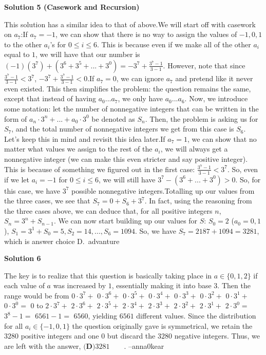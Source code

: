 \begin{enumerate}
 



\textbf{Solution 5 (Casework and Recursion)}

This solution has a similar idea to that of above.We will start off with casework on $a_{7}$:If $a_7 = -1$, we can show that there is no way to assign the values of $-1, 0, 1$ to the other $a_{i}$'s for $0 \leq i \leq 6$. This is because even if we make all of the other $a_{i}$ equal to $1$, we will have that our number is $(-1)(3^{7}) + (3^{6}+3^{5}+...+3^{0}) = -3^{7} + \frac{3^{7}-1}{3-1}$. However, note that since $\frac{3^{7}-1}{3-1} < 3^{7}$, $-3^{7} + \frac{3^{7}-1}{3-1} < 0$.If $a_{7}=0$, we can ignore $a_{7}$ and pretend like it never even existed. This then simplifies the problem: the question remains the same, except that instead of having $a_{0}...a_{7}$, we only have $a_{0}...a_{6}$. Now, we introduce some notation: let the number of nonnegative integers that can be written in the form of $a_{n} \cdot 3^{n} + ... + a_{0} \cdot 3^{0}$ be denoted as $S_{n}$. Then, the problem is asking us for $S_{7}$, and the total number of nonnegative integers we get from this case is $S_{6}$. Let's keep this in mind and revisit this idea later.If $a_{7}=1$, we can show that no matter what values we assign to the rest of the $a_{i}$, we will always get a nonnegative integer (we can make this even stricter and say positive integer). This is because of something we figured out in the first case: $\frac{3^{7}-1}{3-1} < 3^{7}$. So, even if we let $a_{i}=-1$ for $0 \leq i \leq 6$, we will still have $3^{7} - (3^{6}+...+3^{0}) > 0$. So, for this case, we have $3^7$ possible nonnegative integers.Totalling up our values from the three cases, we see that $S_{7} = 0 + S_{6} + 3^{7}$. In fact, using the reasoning from the three cases above, we can deduce that, for all positive integers $n$, $S_{n} = 3^{n} + S_{n-1}$. We can now start building up our values for $S$: $S_{0} = 2$ ($a_{0} = 0, 1$), $S_{1} = 3^{1}+S_{0} = 5, S_{2} = 14, ..., S_{6}=1094$. So, we have $S_{7} = 2187 + 1094 = \boxed{3281}$, which is answer choice $\boxed{\text{D}}$.~advanture

 



\textbf{Solution 6}

The key is to realize that this question is basically taking place in $a\in\{0,1,2\}$ if each value of $a$ was increased by $1$, essentially making it into base $3$. Then the range would be from $0\cdot3^7+$ $0\cdot3^6+$ $0\cdot3^5+$ $0\cdot3^4+$ $0\cdot3^3+$ $0\cdot3^2+$ $0\cdot3^1+$ $0\cdot3^0=$ $0$ to $2\cdot3^7+$ $2\cdot3^6+$ $2\cdot3^5+$ $2\cdot3^4+$ $2\cdot3^3+$ $2\cdot3^2+$ $2\cdot3^1+$ $2\cdot3^0=$ $3^8-1=$ $6561-1=$ $6560$, yielding $6561$ different values. Since the distribution for all $a_i\in \{-1,0,1\}$ the question originally gave is symmetrical, we retain the $3280$ positive integers and one $0$ but discard the $3280$ negative integers. Thus, we are left with the answer, $\boxed{\textbf{(D)} 3281}\qquad$.  --anna0kear


\end{enumerate}
